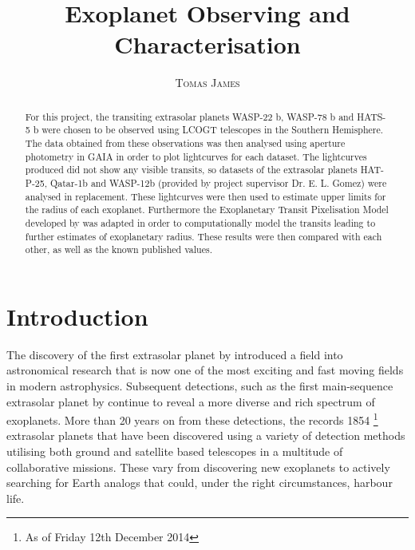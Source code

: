 \documentclass{report}
\title{\vspace{-15mm}\fontsize{24pt}{10pt}\selectfont\textbf{Exoplanet Observing and Characterisation}} %
\author{
\large
\textsc{Tomas James} %
\vspace{-5mm}
}
\date{}
\begin{document}
\maketitle %

\thispagestyle{fancy} %


\begin{abstract}
For this project, the transiting extrasolar planets WASP-22 b, WASP-78 b and HATS-5 b were chosen to be observed using LCOGT telescopes in the Southern Hemisphere. The data obtained from these observations was then analysed using aperture photometry in GAIA in order to plot lightcurves for each dataset. The lightcurves produced did not show any visible transits, so datasets of the extrasolar planets HAT-P-25, Qatar-1b and WASP-12b (provided by project supervisor Dr. E. L. Gomez) were analysed in replacement. These lightcurves were then used to estimate upper limits for the radius of each exoplanet. Furthermore the Exoplanetary Transit Pixelisation Model developed by \textcite{model} was adapted in order to computationally model the transits leading to further estimates of exoplanetary radius. These results were then compared with each other, as well as the known published values.
\end{abstract}


\tableofcontents %
\pagebreak %


\section{Introduction}
The discovery of the first extrasolar planet by \textcite{first} introduced a field into astronomical research that is now one of the most exciting and fast moving fields in modern astrophysics. Subsequent detections, such as the first main-sequence extrasolar planet by \textcite{MQ} continue to reveal a more diverse and rich spectrum of exoplanets. More than 20 years on from these detections, the \textcite{exo} records 1854 \footnote{As of Friday 12th December 2014} extrasolar planets that have been discovered using a variety of detection methods utilising both ground and satellite based telescopes in a multitude of collaborative missions. These vary from discovering new exoplanets to actively searching for Earth analogs that could, under the right circumstances, harbour life.
\end{document}
